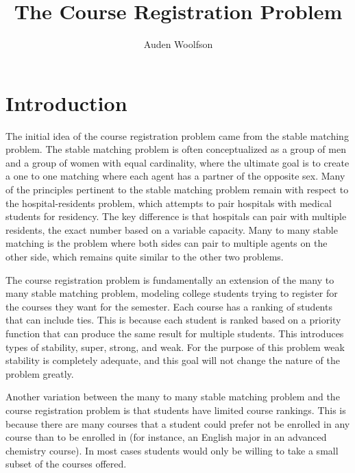 \documentclass{article}
\title{The Course Registration Problem}
\author{Auden Woolfson}
\begin{document}
\maketitle
\section{Introduction}
\setlength\parindent{0pt}\par
The initial idea of the course registration problem came from the stable matching problem. The stable matching problem is often conceptualized as a group of men and a group of women with equal cardinality, where the ultimate goal is to create a one to one matching where each agent has a partner of the opposite sex. Many of the principles pertinent to the stable matching problem remain with respect to the hospital-residents problem, which attempts to pair hospitals with medical students for residency. The key difference is that hospitals can pair with multiple residents, the exact number based on a variable capacity. Many to many stable matching is the problem where both sides can pair to multiple agents on the other side, which remains quite similar to the other two problems.\\\par

The course registration problem is fundamentally an extension of the many to many stable matching problem, modeling college students trying to register for the courses they want for the semester. Each course has a ranking of students that can include ties. This is because each student is ranked based on a priority function that can produce the same result for multiple students. This introduces types of stability, super, strong, and weak. For the purpose of this problem weak stability is completely adequate, and this goal will not change the nature of the problem greatly.\\\par

Another variation between the many to many stable matching problem and the course registration problem is that students have limited course rankings. This is because there are many courses that a student could prefer not be enrolled in any course than to be enrolled in (for instance, an English major in an advanced chemistry course). In most cases students would only be willing to take a small subset of the courses offered.\\\par

\end{document}
